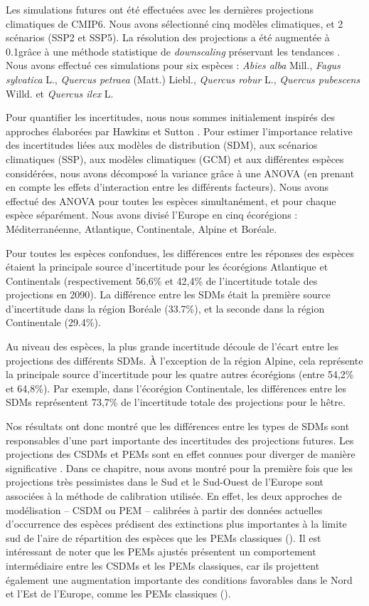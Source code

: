 Les simulations futures ont été effectuées avec les dernières projections climatiques de CMIP6. Nous avons sélectionné cinq modèles climatiques, et 2 scénarios (SSP2 et SSP5). La résolution des projections a été augmentée à 0.1\degree grâce à une méthode statistique de \emph{downscaling} préservant les tendances \citep{Noel2022}. Nous avons effectué ces simulations pour six espèces : \emph{Abies alba} Mill., \emph{Fagus sylvatica} L., \emph{Quercus petraea} (Matt.) Liebl., \emph{Quercus robur} L., \emph{Quercus pubescens} Willd. et \emph{Quercus ilex} L.

Pour quantifier les incertitudes, nous nous sommes initialement inspirés des approches élaborées par Hawkins et Sutton \citep{Hawkins2009, Hawkins2011}. Pour estimer l'importance relative des incertitudes liées aux modèles de distribution (SDM), aux scénarios climatiques (SSP), aux modèles climatiques (GCM) et aux différentes espèces considérées, nous avons décomposé la variance grâce à une ANOVA (en prenant en compte les effets d'interaction entre les différents facteurs). Nous avons effectué des ANOVA pour toutes les espèces simultanément, et pour chaque espèce séparément. Nous avons divisé l'Europe en cinq écorégions : Méditerranéenne, Atlantique, Continentale, Alpine et Boréale. 

Pour toutes les espèces confondues, les différences entre les réponses des espèces étaient la principale source d’incertitude pour les écorégions Atlantique et Continentals (respectivement 56,6\% et 42,4\% de l'incertitude totale des projections en 2090). La différence entre les SDMs était la première source d'incertitude dans la région Boréale (33.7\%), et la seconde dans la région Continentale (29.4\%). 

Au niveau des espèces, la plus grande incertitude découle de l’écart entre les projections des différents SDMs. À l’exception de la région Alpine, cela représente la principale source d’incertitude pour les quatre autres écorégions (entre 54,2\% et 64,8\%). Par exemple, dans l’écorégion Continentale, les différences entre les SDMs représentent 73,7\% de l’incertitude totale des projections pour le hêtre. 

Nos résultats ont donc montré que les différences entre les types de SDMs sont responsables d'une part importante des incertitudes des projections futures. Les projections des CSDMs et PEMs sont en effet connues pour diverger de manière significative \citep{Morin2009, Keenan2011a, Cheaib2012, Takolander2019}. Dans ce chapitre, nous avons montré pour la première fois que les projections très pessimistes dans le Sud et le Sud-Ouest de l'Europe sont associées à la méthode de calibration utilisée. En effet, les deux approches de modélisation -- CSDM ou PEM -- calibrées à partir des données actuelles d'occurrence des espèces prédisent des extinctions plus importantes à la limite sud de l’aire de répartition des espèces que les PEMs classiques (). Il est intéressant de noter que les PEMs ajustés présentent un comportement intermédiaire entre les CSDMs et les PEMs classiques, car ils projettent également une augmentation importante des conditions favorables dans le Nord et l'Est de l'Europe, comme les PEMs classiques ().

